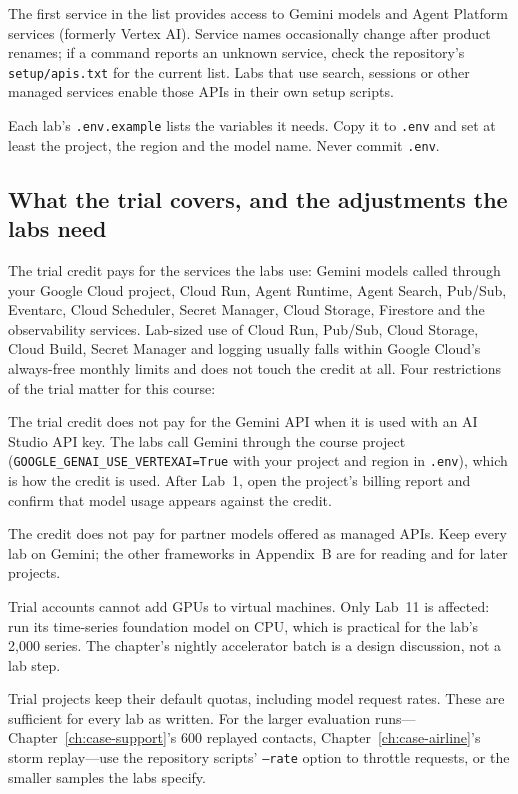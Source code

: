 The first service in the list provides access to Gemini models and Agent Platform services (formerly Vertex AI). Service names occasionally change after product renames; if a command reports an unknown service, check the repository's \texttt{setup/apis.txt} for the current list. Labs that use search, sessions or other managed services enable those APIs in their own setup scripts.

Each lab's \texttt{.env.example} lists the variables it needs. Copy it to \texttt{.env} and set at least the project, the region and the model name. Never commit \texttt{.env}.

\subsection{What the trial covers, and the adjustments the labs need}

The trial credit pays for the services the labs use: Gemini models called through your Google Cloud project, Cloud Run, Agent Runtime, Agent Search, Pub/Sub, Eventarc, Cloud Scheduler, Secret Manager, Cloud Storage, Firestore and the observability services. Lab-sized use of Cloud Run, Pub/Sub, Cloud Storage, Cloud Build, Secret Manager and logging usually falls within Google Cloud's always-free monthly limits and does not touch the credit at all. Four restrictions of the trial matter for this course:

\begin{description}[leftmargin=1em,itemsep=3pt]
  \item[Gemini through your project, not through AI Studio.] The trial credit does not pay for the Gemini API when it is used with an AI Studio API key. The labs call Gemini through the course project (\texttt{GOOGLE\_GENAI\_USE\_VERTEXAI=True} with your project and region in \texttt{.env}), which is how the credit is used. After Lab~1, open the project's billing report and confirm that model usage appears against the credit.
  \item[Google's models only.] The credit does not pay for partner models offered as managed APIs. Keep every lab on Gemini; the other frameworks in Appendix~B are for reading and for later projects.
  \item[No GPUs.] Trial accounts cannot add GPUs to virtual machines. Only Lab~11 is affected: run its time-series foundation model on CPU, which is practical for the lab's 2{,}000 series. The chapter's nightly accelerator batch is a design discussion, not a lab step.
  \item[No quota increases.] Trial projects keep their default quotas, including model request rates. These are sufficient for every lab as written. For the larger evaluation runs---Chapter~\ref{ch:case-support}'s 600 replayed contacts, Chapter~\ref{ch:case-airline}'s storm replay---use the repository scripts' \texttt{--rate} option to throttle requests, or the smaller samples the labs specify.
\end{description}

